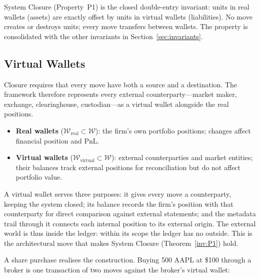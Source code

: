 System Closure (Property~P1) is the closed double-entry invariant: units in real wallets (assets) are exactly offset by units in virtual wallets (liabilities). No move creates or destroys units; every move transfers between wallets. The property is consolidated with the other invariants in Section~\ref{sec:invariants}.

\subsection{Virtual Wallets}

Closure requires that every move have both a source and a destination. The framework therefore represents every external counterparty---market maker, exchange, clearinghouse, custodian---as a virtual wallet alongside the real positions.

\begin{definition}\hfill
\begin{itemize}[nosep]
\item \textbf{Real wallets} ($\mathcal{W}_{\mathrm{real}} \subset \mathcal{W}$): the firm's own portfolio positions; changes affect financial position and PnL.
\item \textbf{Virtual wallets} ($\mathcal{W}_{\mathrm{virtual}} \subset \mathcal{W}$): external counterparties and market entities; their balances track external positions for reconciliation but do not affect portfolio value.
\end{itemize}
\end{definition}

A virtual wallet serves three purposes: it gives every move a counterparty, keeping the system closed; its balance records the firm's position with that counterparty for direct comparison against external statements; and the metadata trail through it connects each internal position to its external origin. The external world is thus inside the ledger: within its scope the ledger has no outside. This is the architectural move that makes System Closure (Theorem~\ref{inv:P1}) hold.

A share purchase realises the construction. Buying 500 AAPL at \$100 through a broker is one transaction of two moves against the broker's virtual wallet:

